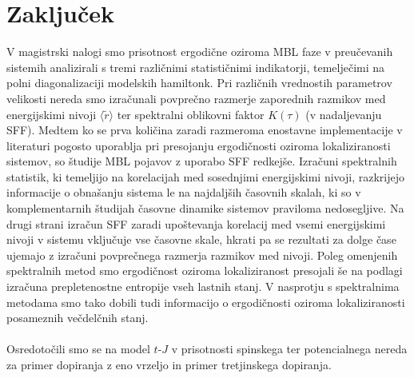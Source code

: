 \chapter{Zaključek}
V magistrski nalogi smo prisotnost ergodične oziroma MBL faze v preučevanih sistemih analizirali s tremi različnimi statističnimi indikatorji, temelječimi na polni diagonalizaciji modelskih hamiltonk. Pri različnih vrednostih parametrov velikosti nereda smo izračunali povprečno razmerje zaporednih razmikov med energijskimi nivoji $\langle \tilde{r}\rangle$ ter spektralni oblikovni faktor $K(\tau)$ (v nadaljevanju SFF). Medtem ko se prva količina zaradi razmeroma enostavne implementacije v literaturi pogosto uporablja pri presojanju ergodičnosti oziroma lokaliziranosti sistemov, so študije MBL pojavov z uporabo SFF redkejše. Izračuni spektralnih statistik, ki temeljijo na korelacijah med sosednjimi energijskimi nivoji, razkrijejo informacije o obnašanju sistema le na najdaljših časovnih skalah, ki so v komplementarnih študijah časovne dinamike sistemov praviloma nedosegljive. Na drugi strani izračun SFF zaradi upoštevanja korelacij med vsemi energijskimi nivoji v sistemu vključuje vse časovne skale, hkrati pa se rezultati za dolge čase ujemajo z izračuni povprečnega razmerja razmikov med nivoji. Poleg omenjenih spektralnih metod smo ergodičnost oziroma lokaliziranost presojali še na podlagi izračuna prepletenostne entropije vseh lastnih stanj. V nasprotju s spektralnima metodama smo tako dobili tudi informacijo o ergodičnosti oziroma lokaliziranosti posameznih večdelčnih stanj.\\\\
 Osredotočili smo se na model $t$-$J$ v prisotnosti spinskega ter potencialnega nereda za primer dopiranja z eno vrzeljo in primer tretjinskega dopiranja.
